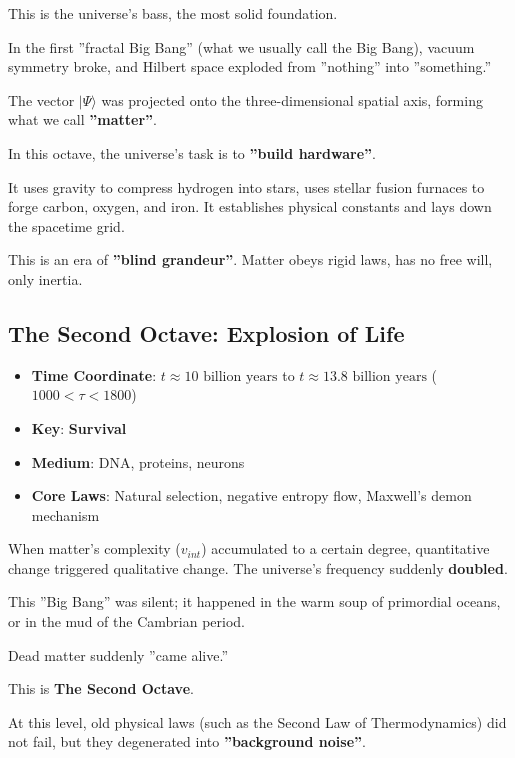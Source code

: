 This is the universe's bass, the most solid foundation.

In the first ''fractal Big Bang'' (what we usually call the Big Bang), vacuum symmetry broke, and Hilbert space exploded from ''nothing'' into ''something.''

The vector $|\Psi\rangle$ was projected onto the three-dimensional spatial axis, forming what we call \textbf{''matter''}.

In this octave, the universe's task is to \textbf{''build hardware''}.

It uses gravity to compress hydrogen into stars, uses stellar fusion furnaces to forge carbon, oxygen, and iron. It establishes physical constants and lays down the spacetime grid.

This is an era of \textbf{''blind grandeur''}. Matter obeys rigid laws, has no free will, only inertia.

\subsection{The Second Octave: Explosion of Life}

\begin{itemize}
\item \textbf{Time Coordinate}: $t \approx 10 \text{ billion years}$ to $t \approx 13.8 \text{ billion years}$ ($1000 < \tau < 1800$)

\item \textbf{Key}: \textbf{Survival}

\item \textbf{Medium}: DNA, proteins, neurons

\item \textbf{Core Laws}: Natural selection, negative entropy flow, Maxwell's demon mechanism
\end{itemize}

When matter's complexity ($v_{int}$) accumulated to a certain degree, quantitative change triggered qualitative change. The universe's frequency suddenly \textbf{doubled}.

This ''Big Bang'' was silent; it happened in the warm soup of primordial oceans, or in the mud of the Cambrian period.

Dead matter suddenly ''came alive.''

This is \textbf{The Second Octave}.

At this level, old physical laws (such as the Second Law of Thermodynamics) did not fail, but they degenerated into \textbf{''background noise''}.


